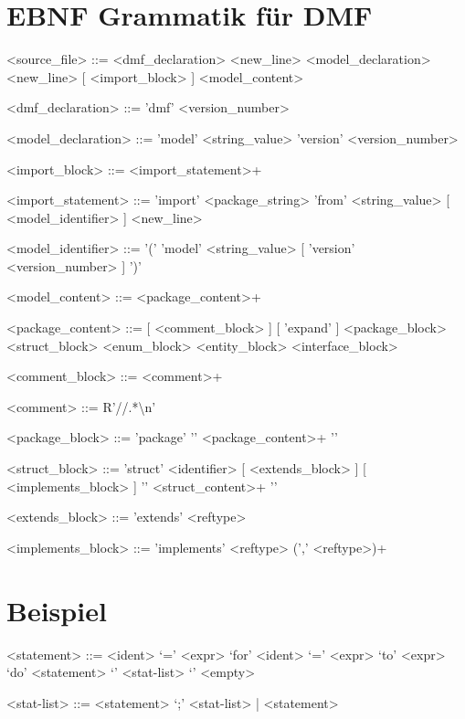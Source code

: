 \documentclass[./einleitung.tex]{subfiles}
\begin{document}
\section{EBNF Grammatik für DMF}
\setlength{\grammarparsep}{20pt plus 1pt minus 1pt} %
\setlength{\grammarindent}{12em} %

\begin{grammar}
<source_file> ::= <dmf_declaration> <new_line> <model_declaration> <new_line> [ <import_block> ] <model_content>

<dmf_declaration> ::= 'dmf' <version_number>


<model_declaration> ::= 'model' <string_value> 'version' <version_number>

<import_block> ::= <import_statement>+

<import_statement> ::= 'import' <package_string> 'from' <string_value> [ <model_identifier> ] <new_line>

<model_identifier> ::= '(' 'model' <string_value> [ 'version' <version_number> ] ')'


<model_content> ::= <package_content>+

<package_content> ::= [ <comment_block> ] [ 'expand' ] <package_block>
 <struct_block>
 <enum_block>
 <entity_block>
 <interface_block>

<comment_block> ::= <comment>+

<comment> ::= R'//.*\textbackslash n'

<package_block> ::= 'package' '{' <package_content>+ '}'

<struct_block> ::= 'struct' <identifier> [ <extends_block> ] [ <implements_block> ] '{' <struct_content>+ '}'

<extends_block> ::= 'extends' <reftype>

<implements_block> ::= 'implements' <reftype> (',' <reftype>)+



\end{grammar}

\section{Beispiel}
\setlength{\grammarparsep}{20pt plus 1pt minus 1pt} %
\setlength{\grammarindent}{12em} %

\begin{grammar}
<statement> ::= <ident> `=' <expr> 
\alt `for' <ident> `=' <expr> `to' <expr> `do' <statement> 
\alt `{' <stat-list> `}' 
\alt <empty> 

<stat-list> ::= <statement> `;' <stat-list> | <statement> 

\end{grammar}
\end{document}
